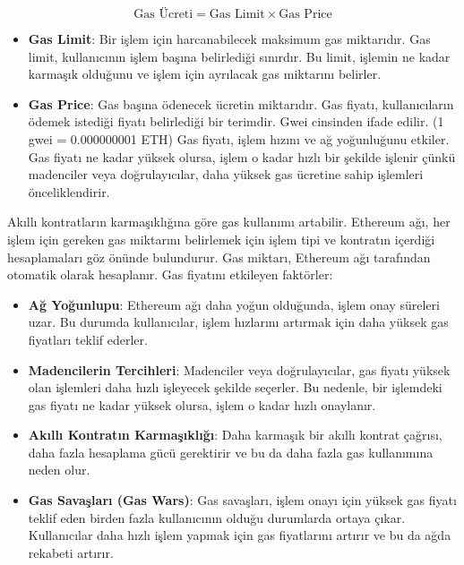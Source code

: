 \[ \text{Gas Ücreti} = \text{Gas Limit} \times \text{Gas Price} \]

\begin{itemize}
    \item \textbf{Gas Limit}: Bir işlem için harcanabilecek maksimum gas miktarıdır. Gas limit, kullanıcının işlem başına belirlediği sınırdır. Bu limit, işlemin ne kadar karmaşık olduğunu ve işlem için ayrılacak gas miktarını belirler.
    \item \textbf{Gas Price}: Gas başına ödenecek ücretin miktarıdır. Gas fiyatı, kullanıcıların ödemek istediği fiyatı belirlediği bir terimdir. Gwei cinsinden ifade edilir. (1 gwei = 0.000000001 ETH) Gas fiyatı, işlem hızını ve ağ yoğunluğunu etkiler. Gas fiyatı ne kadar yüksek olursa, işlem o kadar hızlı bir şekilde işlenir çünkü madenciler veya doğrulayıcılar, daha yüksek gas ücretine sahip işlemleri önceliklendirir.
\end{itemize}

Akıllı kontratların karmaşıklığına göre gas kullanımı artabilir. Ethereum ağı, her işlem için gereken gas miktarını belirlemek için işlem tipi ve kontratın içerdiği hesaplamaları göz önünde bulundurur. Gas miktarı, Ethereum ağı tarafından otomatik olarak hesaplanır. Gas fiyatını etkileyen faktörler:

\begin{itemize}
    \item \textbf{Ağ Yoğunlupu}: Ethereum ağı daha yoğun olduğunda, işlem onay süreleri uzar. Bu durumda kullanıcılar, işlem hızlarını artırmak için daha yüksek gas fiyatları teklif ederler.
    \item \textbf{Madencilerin Tercihleri}: Madenciler veya doğrulayıcılar, gas fiyatı yüksek olan işlemleri daha hızlı işleyecek şekilde seçerler. Bu nedenle, bir işlemdeki gas fiyatı ne kadar yüksek olursa, işlem o kadar hızlı onaylanır.
    \item \textbf{Akıllı Kontratın Karmaşıklığı}: Daha karmaşık bir akıllı kontrat çağrısı, daha fazla hesaplama gücü gerektirir ve bu da daha fazla gas kullanımına neden olur.
    \item \textbf{Gas Savaşları (Gas Wars)}: Gas savaşları, işlem onayı için yüksek gas fiyatı teklif eden birden fazla kullanıcının olduğu durumlarda ortaya çıkar. Kullanıcılar daha hızlı işlem yapmak için gas fiyatlarını artırır ve bu da ağda rekabeti artırır.
\end{itemize}

\newpage